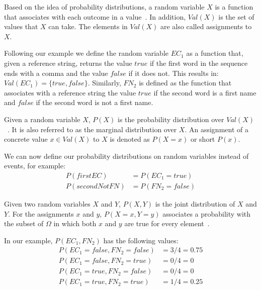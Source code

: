 \bigskip

Based on the idea of \glspl{probability distribution}, a \gls{random variable} $X$ is a \gls{function} that associates with each outcome in  a value~\cite{koller2009probabilistic}.
In addition, $Val(X)$ is the set of values that $X$ can take.
The elements in $Val(X)$ are also called \glspl{assignment} to $X$.

Following our example we define the \gls{random variable} $EC_1$ as a \gls{function} that, given a reference string, returns the value $true$ if the first word in the sequence ends with a comma and the value $false$ if it does not.
This results in: $Val(EC_1)=\{true, false\}$.
Similarly, $FN_2$ is defined as the function that associates with a reference string the value $true$ if the second word is a first name and $false$ if the second word is not a first name.

\bigskip

Given a \gls{random variable} $X$, $P(X)$ is the \gls{probability distribution} over $Val(X)$~\cite{koller2009probabilistic}.
It is also referred to as the \gls{marginal distribution} over $X$.
An \gls{assignment} of a concrete value $x\in Val(X)$ to $X$ is denoted as $P(X=x)$ or short $P(x)$.

We can now define our \glspl{probability distribution} on \glspl{random variable} instead of \glspl{event}, for example:
\begin{equation*}
  \begin{split}
    P(firstEC)&= P(EC_1{=}true)\\
    P(secondNotFN)&= P(FN_2{=}false)
  \end{split}
\end{equation*}

\bigskip

Given two \glspl{random variable} $X$ and $Y$, $P(X,Y)$ is the \gls{joint distribution} of $X$ and $Y$.
For the assignments $x$ and $y$, $P(X{=}x,Y{=}y)$ associates a probability with the subset of $\Omega$ in which both $x$ and $y$ are true for every element~\cite{koller2009probabilistic}.

In our example, $P(EC_1,FN_2)$ has the following values:
\begin{equation*}
  \begin{split}
    P(EC_1{=}false,FN_2{=}false)&=3/4=0.75\\
    P(EC_1{=}false,FN_2{=}true)&=0/4=0\\
    P(EC_1{=}true,FN_2{=}false)&=0/4=0\\
    P(EC_1{=}true,FN_2{=}true)&=1/4=0.25
  \end{split}
\end{equation*}

